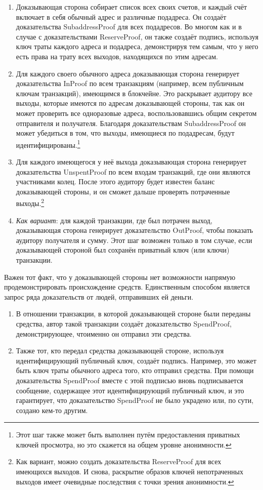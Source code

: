 \begin{enumerate}
    \item Доказывающая сторона собирает список всех своих счетов, и каждый счёт включает в себя обычный адрес и различные подадреса. Он создаёт доказательства SubaddressProof для всех подадресов. Во многом как и в случае с доказательствами ReserveProof, он также создаёт подпись, используя ключ траты каждого адреса и подадреса, демонстри\-руя тем самым, что у него есть права на трату всех выходов, находящихся по этим адресам.
    \item Для каждого своего обычного адреса доказывающая сторона генерирует доказательства InProof по всем транзакциям (например, всем публичным ключам транзакций), имею\-щимся в блокчейне. Это раскрывает аудитору все выходы, которые имеются по адресам доказывающей стороны, так как он может проверить все одноразовые адреса, воспользо\-вавшись общим секретом отправителя и получателя. Благодаря доказательствам SubaddressProof он может убедиться в том, что выходы, имеющиеся по подадресам, будут идентифицированы.\footnote{Этот шаг также может быть выполнен путём предоставления приватных ключей просмотра, но это скажется на общем уровне анонимности.}
    \item Для каждого имеющегося у неё выхода доказывающая сторона генерирует доказатель\-ства UnspentProof по всем входам транзакций, где они являются участниками колец. После этого аудитору будет известен баланс доказывающей стороны, и он сможет дальше проверять потраченные выходы.\footnote{Как вариант, можно создать доказательства ReserveProof для всех имеющихся выходов. И снова, раскрытие образов ключей непотраченных выходов имеет очевидные последствия с точки зрения анонимности.}
    \item {\em Как вариант}: для каждой транзакции, где был потрачен выход, доказывающая сторона генерирует доказательство OutProof, чтобы показать аудитору получателя и сумму. Этот шаг возможен только в том случае, если доказывающей стороной был сохранён приватный ключ (или ключи) транзакции.
\end{enumerate}{}

Важен тот факт, что у доказывающей стороны нет возможности напрямую продемонстриро\-вать происхождение средств. Единственным способом является запрос ряда доказательств от людей, отправивших ей деньги.

\begin{enumerate}
    \item В отношении транзакции, в которой доказывающей стороне были переданы средства, автор такой транзакции создаёт доказательство SpendProof, демонстрирующее, что\linebreak именно он отправил эти средства.
    \item Также тот, кто передал средства доказывающей стороне, используя идентифицирующий публичный ключ, создаёт подпись. Например, это может быть ключ траты обычного адреса того, кто отправил средства. При помощи доказательства SpendProof вместе с этой подписью вновь подписывается сообщение, содержащее этот идентифицирующий публичный ключ, и это гарантирует, что доказательство SpendProof не было украдено или, по сути, создано кем-то другим.
\end{enumerate}{}